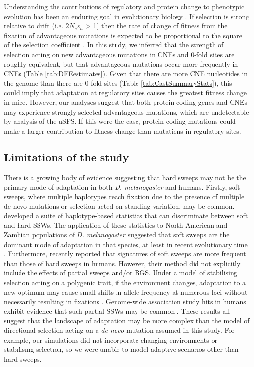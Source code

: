 	Understanding the contributions of regulatory and protein change to phenotypic evolution has been an enduring goal in evolutionary biology \cite{RN347, RN346, RN348}. If selection is strong relative to drift (i.e. $2N_es_a$ > 1) then the rate of change of fitness from the fixation of advantageous mutations is expected to be proportional to the square of the selection coefficient \citep{RN391}. In this study, we inferred that the strength of selection acting on new advantageous mutations in CNEs and 0-fold sites are roughly equivalent, but that advantageous mutations occur more frequently in CNEs (Table \ref{tab:DFEestimates}). Given that there are more CNE nucleotides in the genome than there are 0-fold sites (Table \ref{tab:CastSummaryStats}), this could imply that adaptation at regulatory sites causes the greatest fitness change in mice. However, our analyses suggest that both protein-coding genes and CNEs may experience strongly selected advantageous mutations, which are undetectable by analysis of the uSFS. If this were the case, protein-coding mutations could make a larger contribution to fitness change than mutations in regulatory sites.

\subsection{Limitations of the study}

	There is a growing body of evidence suggesting that hard sweeps may not be the primary mode of adaptation in both \textit{D. melanogaster} and humans. Firstly, soft sweeps, where multiple haplotypes reach fixation due to the presence of multiple de novo mutations or selection acted on standing variation, may be common. \cite{RN208} developed a suite of haplotype-based statistics that can discriminate between soft and hard SSWs. The application of these statistics to North American and Zambian populations of \textit{D. melanogaster} suggested that soft sweeps are the dominant mode of adaptation in that species, at least in recent evolutionary time \citep{RN208,RN303}. Furthermore, \cite{RN337} recently reported that signatures of soft sweeps are more frequent than those of hard sweeps in humans. However, their method did not explicitly include the effects of partial sweeps and/or BGS. Under a model of stabilising selection acting on a polygenic trait, if the environment changes, adaptation to a new optimum may cause small shifts in allele frequency at numerous loci without necessarily resulting in fixations \citep{RN390, RN147}. Genome-wide association study hits in humans exhibit evidence that such partial SSWs may be common \citep{RN301}. These results all suggest that the landscape of adaptation may be more complex than the model of directional selection acting on a \textit{de novo} mutation assumed in this study. For example, our simulations did not incorporate changing environments or stabilising selection, so we were unable to model adaptive scenarios other than hard sweeps. 

